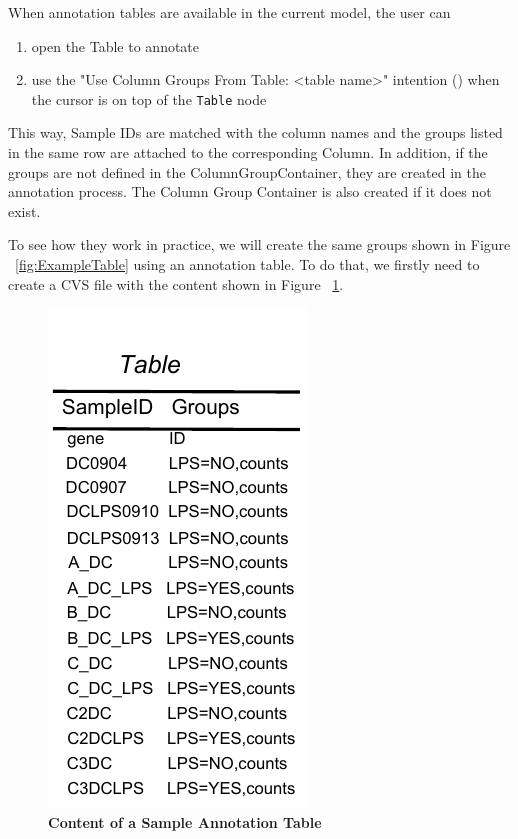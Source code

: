 When annotation tables are available in the current model, the user can
\begin{enumerate}
\item  open the Table to annotate 
\item use the "Use Column Groups From Table: <table name>" intention (\intentionLightBulb) when the cursor is on top of the \texttt{Table} node
\end{enumerate}
This way, Sample IDs are matched with the column names and the groups listed in the same row are attached to the corresponding Column. In addition, if the groups are not defined in the ColumnGroupContainer, they are created in the annotation process. The Column Group Container is also created if it does not exist.

To see how they work in practice, we will create the same groups shown in Figure ~\ref{fig:ExampleTable} using an annotation table. To do that, we firstly need to create a CVS file with the content shown in Figure ~\ref{fig:AnnotateTableSample}.

\begin{figure}[h!tbp]
  \centering
  \includegraphics[width=\figWidthTiny]{figures/AnnotationTableSample.pdf}
\caption[Content of a Sample Annotation Table]{\textbf{Content of a Sample Annotation Table} }
\label{fig:AnnotateTableSample}
\end{figure}

